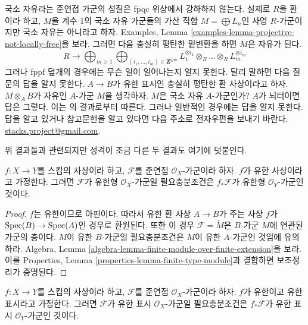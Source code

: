 \begin{remark}
\label{remark-locally-free-descends}
국소 자유라는 준연접 가군의 성질은 fpqc 위상에서 강하하지 않는다.
실제로 $R$을 환이라 하고, $M$을 계수 1의 국소 자유 가군들의 가산 직합
$M = \bigoplus L_n$인 사영 $R$-가군이지만 국소 자유는 아니라고 하자.
Examples, Lemma \ref{examples-lemma-projective-not-locally-free}을 보라.
그러면 다음 충실히 평탄한 밑변환을 하면 $M$은 자유가 된다.
$$
R \longrightarrow
\bigoplus\nolimits_{m \geq 1}
\bigoplus\nolimits_{(i_1, \ldots, i_m) \in \mathbf{Z}^{\oplus m}}
L_1^{\otimes i_1} \otimes_R \ldots \otimes_R L_m^{\otimes i_m}
$$
그러나 fppf 덮개의 경우에는 무슨 일이 일어나는지 알지 못한다. 달리
말하면 다음 질문의 답을 알지 못한다. $A \to B$가 유한 표시인 충실히
평탄한 환 사상이라고 하자. $M \otimes_A B$가 자유인 $A$-가군 $M$을
생각하자. $M$은 국소 자유 $A$-가군인가? $A$가 뇌터이면 답은 그렇다.
이는 \cite{Bass}의 결과로부터 따른다. 그러나 일반적인 경우에는 답을
알지 못한다. 답을 알고 있거나 참고문헌을 알고 있다면 다음 주소로
전자우편을 보내기 바란다.
\href{mailto:stacks.project@gmail.com}{stacks.project@gmail.com}.
\end{remark}

\noindent
위 결과들과 관련되지만 성격이 조금 다른 두 결과도 여기에 덧붙인다.

\begin{lemma}
\label{lemma-finite-over-finite-module}
$f : X \to Y$를 스킴의 사상이라 하고, $\mathcal{F}$를 준연접
$\mathcal{O}_X$-가군이라 하자. $f$가 유한 사상이라고 가정한다. 그러면
$\mathcal{F}$가 유한형 $\mathcal{O}_X$-가군일 필요충분조건은
$f_*\mathcal{F}$가 유한형 $\mathcal{O}_Y$-가군인 것이다.
\end{lemma}

\begin{proof}
$f$는 유한이므로 아핀이다. 따라서 유한 환 사상 $A \to B$가 주는 사상
$f$가 $\mathop{\mathrm{Spec}}(B) \to \mathop{\mathrm{Spec}}(A)$인 경우로 환원된다. 또한 이 경우
$\mathcal{F} = \widetilde{M}$은 $B$-가군 $M$에 연관된 가군의 층이다.
$M$이 유한 $B$-가군일 필요충분조건은 $M$이 유한 $A$-가군인 것임에
유의하라.
Algebra, Lemma \ref{algebra-lemma-finite-module-over-finite-extension}을 보라.
이를 Properties, Lemma \ref{properties-lemma-finite-type-module}과 결합하면
보조정리가 증명된다.
\end{proof}

\begin{lemma}
\label{lemma-finite-finitely-presented-module}
$f : X \to Y$를 스킴의 사상이라 하고, $\mathcal{F}$를 준연접
$\mathcal{O}_X$-가군이라 하자. $f$가 유한이고 유한 표시라고 가정한다.
그러면 $\mathcal{F}$가 유한 표시 $\mathcal{O}_X$-가군일 필요충분조건은
$f_*\mathcal{F}$가 유한 표시 $\mathcal{O}_Y$-가군인 것이다.
\end{lemma}

